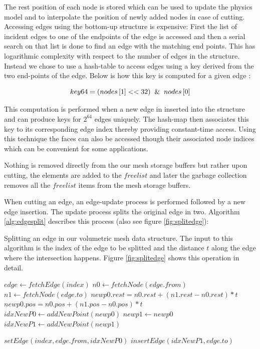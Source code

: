 The rest position of each node is stored which can be used to update the physics model and to interpolate the position 
of newly added nodes in case of cutting. Accessing edges using the bottom-up structure is expensive: First the list of incident 
edges to one of the endpoints of the edge is accessed and then a serial search on that list is done to find an edge with the matching 
end points. This has logarithmic complexity with respect to the number of edges in the structure. Instead we chose to use a hash-table
to access edges using a key derived from the two end-points of the edge. Below is how this key is computed for a given edge 
\cite{Mario2010PolygonMesh, Bloomenthal1997}:

\begin{equation}
 key64 = (nodes\left[ 1 \right] << 32) \And nodes\left[ 0 \right]
\end{equation}

This computation is performed when a new edge in inserted into the structure and can produce keys for $2^{64}$ edges uniquely. 
The hash-map then associates this key to its corresponding edge index thereby providing constant-time access. 
Using this technique the faces can also be accessed though their associated node indices which can be convenient for some applications. 

Nothing is removed directly from the our mesh storage buffers but rather upon cutting, the elements
are added to the $freelist$ and later the garbage collection removes all the $freelist$ items from the mesh storage buffers. 

When cutting an edge, an edge-update process is performed followed by a new edge insertion. 
The update process splits the original edge in two. Algorithm \ref{alg:edgesplit} describes this process (also see figure \ref{fig:splitedge}):

\begin{algorithm}[H]
\caption{Splitting an edge in our volumetric mesh data structure. The input to this algorithm is the index of the edge to be splitted
and the distance $t$ along the edge where the intersection happens. Figure \ref{fig:splitedge} shows this operation in detail. }
\label{alg:edgesplit}
\begin{algorithmic}[1]	
  \STATE $edge \gets fetchEdge(index)$
  \STATE $n0 \gets fetchNode(edge.from)$
  \STATE $n1 \gets fetchNode(edge.to)$
  \STATE $newp0.rest = n0.rest + (n1.rest - n0.rest) * t$
  \STATE $newp0.pos = n0.pos + (n1.pos - n0.pos) * t$
  \STATE $idxNewP0 \gets addNewPoint(newp0)$
  \STATE $newp1 \gets newp0$
  \STATE $idxNewP1 \gets addNewPoint(newp1)$
  
  \STATE $setEdge(index, edge.from, idxNewP0)$
  \STATE $insertEdge(idxNewP1, edge.to)$

\end{algorithmic}
\end{algorithm}

